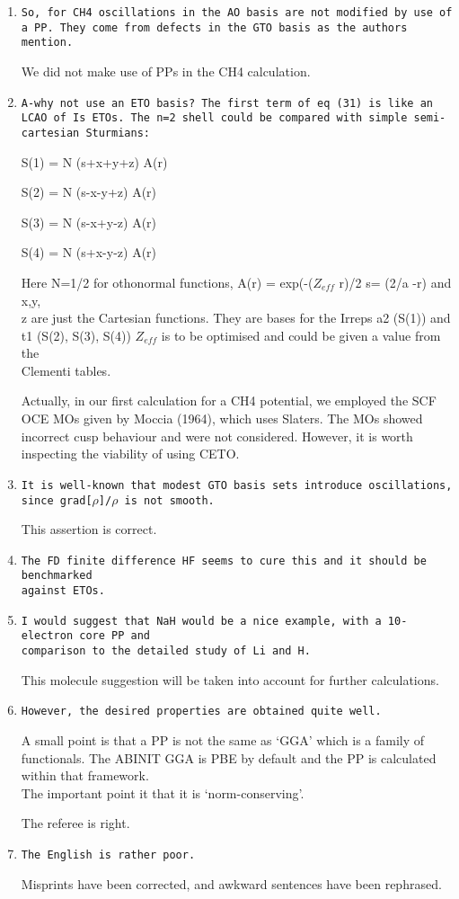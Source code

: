 \documentclass[10pt]{article}
\begin{document}
\begin{enumerate}
 \item {\tt So, for CH4 oscillations in the AO basis are not modified
 by use of a PP. They come from defects in the GTO basis as the authors
 mention. }
 
 We did not make use of PPs in the CH4 calculation.
 
 \item {\tt A-why not use an ETO basis? The first term of eq (31) is 
 like an LCAO of Is ETOs.
 The n=2 shell could be compared with simple semi-cartesian Sturmians:

 S(1) = N (s+x+y+z) A(r) 

 S(2) = N (s-x-y+z) A(r) 
 
 S(3) = N (s-x+y-z) A(r) 

 S(4) = N (s+x-y-z) A(r) 

 Here N=1/2 for othonormal functions,  A(r) = exp(-($Z_{eff}$ r)/2 
 s= (2/a -r) and x,y,\\z are just the Cartesian functions. They are 
 bases for the Irreps a2 (S(1)) and \\ t1 (S(2), S(3), S(4)) 
 $Z_{eff}$ is to be optimised and could be given a value from the \\
 Clementi  tables.}
 
 Actually, in our first calculation for a CH4 potential, we employed 
 the SCF OCE MOs given by Moccia (1964), which uses Slaters. The MOs
 showed incorrect cusp behaviour and were not considered. However, it is
 worth inspecting the viability of using CETO.

 \item {\tt It is well-known that modest GTO basis sets introduce 
 oscillations, since grad[$\rho$]/$\rho$ is not smooth.}
 
 This assertion is correct.
 
 \item {\tt The FD finite difference HF seems to cure this and it should 
 be benchmarked \\ against ETOs.}

  \item {\tt I would suggest that NaH would be a nice example, with 
  a 10-electron core PP and \\ comparison to the detailed study of Li 
  and H.}
  
  This molecule suggestion will be taken into account for further 
  calculations.

 \item {\tt However, the desired properties are obtained quite well.
 
 A small point is that a PP is not the same as ‘GGA’ which is 
 a family of  functionals. The ABINIT GGA is PBE by default and the PP 
 is calculated within that framework. \\ The important point it that it 
 is ‘norm-conserving’.}
 
 The referee is right. 
 
 \item {\tt The English is rather poor.} 
 
 Misprints have been corrected, and awkward sentences have been
 rephrased.
 
 
\end{enumerate}

 
\end{document}
